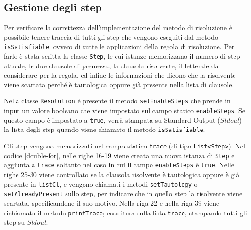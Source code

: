 \documentclass[a4paper,12pt]{report}
\begin{document}
\subsection{Gestione degli step}
\label{step}
Per verificare la correttezza dell'implementazione del metodo di risoluzione è possibile tenere traccia di tutti gli step che vengono eseguiti dal metodo \texttt{isSatisfiable}, ovvero di tutte le applicazioni della regola di risoluzione. Per farlo è stata scritta la classe \texttt{Step}, le cui istanze memorizzano il numero di step attuale, le due clausole di premessa, la clausola risolvente, il letterale da considerare per la regola, ed infine le informazioni che dicono che la risolvente viene scartata perché è tautologica oppure già presente nella lista di clausole.

Nella classe \texttt{Resolution} è presente il metodo \texttt{setEnableSteps} che prende in input un valore booleano che viene impostato sul campo statico \texttt{enableSteps}. Se questo campo è impostato a \texttt{true}, verrà stampata su Standard Output (\emph{Stdout}) la lista degli step quando viene chiamato il metodo \texttt{isSatisfiable}.

Gli step vengono memorizzati nel campo statico \texttt{trace} (di tipo \texttt{List<Step>}). Nel codice \ref{double-for}, nelle righe 16-19 viene creata una nuova istanza di \texttt{Step} e aggiunta a \texttt{trace} soltanto nel caso in cui il campo \texttt{enableSteps} è \texttt{true}. Nelle righe 25-30 viene controllato se la clausola risolvente è tautologica oppure è già presente in \texttt{listCl}, e vengono chiamati i metodi \texttt{setTautology} o \texttt{setAlreadyPresent} sullo step, per indicare che in quello step la risolvente viene scartata, specificandone il suo motivo. Nella riga 22 e nella riga 39 viene richiamato il metodo \texttt{printTrace}; esso itera sulla lista \texttt{trace}, stampando tutti gli step su \emph{Stdout}. 
\end{document}
